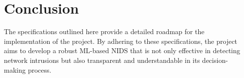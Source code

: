 \section{Conclusion}
The specifications outlined here provide a detailed roadmap for the implementation of the project. By adhering to these specifications, the project aims to develop a robust ML-based NIDS that is not only effective in detecting network intrusions but also transparent and understandable in its decision-making process.

